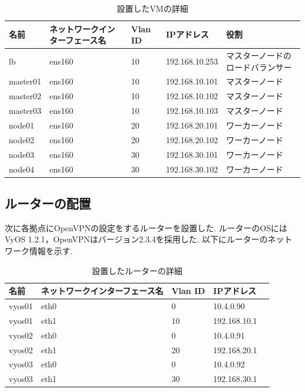 \begin{landscape}
  \begin{table}[htb]
    \begin{center}
      \caption{設置したVMの詳細}
      \begin{tabular}{|l|l|l|l|l|} \hline
        名前 & ネットワークインターフェース名 & Vlan ID & IPアドレス & 役割 \\ \hline
        lb & ens160 & 10 & 192.168.10.253 & マスターノードのロードバランサー \\ \hline
        master01 & ens160 & 10 & 192.168.10.101 & マスターノード \\ \hline
        master02 & ens160 & 10 & 192.168.10.102 & マスターノード \\ \hline
        master03 & ens160 & 10 & 192.168.10.103 & マスターノード \\ \hline
        node01 & ens160 & 20 & 192.168.20.101 & ワーカーノード \\ \hline
        node02 & ens160 & 20 & 192.168.20.102 & ワーカーノード \\ \hline
        node03 & ens160 & 30 & 192.168.30.101 & ワーカーノード \\ \hline
        node04 & ens160 & 30 & 192.168.30.102 & ワーカーノード \\ \hline
      \end{tabular}
    \end{center}
  \end{table}
\end{landscape}

\subsection{ルーターの配置}

次に各拠点にOpenVPNの設定をするルーターを設置した.
ルーターのOSにはVyOS 1.2.1，OpenVPNはバージョン2.3.4を採用した.
以下にルーターのネットワーク情報を示す.

\begin{table}[htb]
  \begin{center}
    \caption{設置したルーターの詳細}
    \begin{tabular}{|l|l|l|l|l|} \hline
      名前 & ネットワークインターフェース名 & Vlan ID & IPアドレス \\ \hline
      vyos01 & eth0 & 0 & 10.4.0.90 \\ \hline
      vyos01 & eth1 & 10 & 192.168.10.1 \\ \hline
      vyos02 & eth0 & 0 & 10.4.0.91 \\ \hline
      vyos02 & eth1 & 20 & 192.168.20.1 \\ \hline
      vyos03 & eth0 & 0 & 10.4.0.92 \\ \hline
      vyos03 & eth1 & 30 & 192.168.30.1 \\ \hline
    \end{tabular}
  \end{center}
\end{table}

